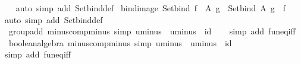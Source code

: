 \begin{isabellebody}
%
\isadelimproof
\ \ %
\endisadelimproof
%
\isatagproof
{}\isamarkupfalse%
\ {\isacharparenleft}{\kern0pt}auto\ simp\ add{\isacharcolon}{\kern0pt}\ Set{\isachardot}{\kern0pt}bind{\isacharunderscore}{\kern0pt}def{\isacharparenright}{\kern0pt}%
\endisatagproof
{\isafoldproof}%
%
\isadelimproof
\isanewline
%
\endisadelimproof
\isanewline
{}\isamarkupfalse%
\ bind{\isacharunderscore}{\kern0pt}image{\isacharcolon}{\kern0pt}\ {\isachardoublequoteopen}Set{\isachardot}{\kern0pt}bind\ {\isacharparenleft}{\kern0pt}f\ {\isacharbackquote}{\kern0pt}\ A{\isacharparenright}{\kern0pt}\ g\ {\isacharequal}{\kern0pt}\ Set{\isachardot}{\kern0pt}bind\ A\ {\isacharparenleft}{\kern0pt}g\ {\isasymcirc}\ f{\isacharparenright}{\kern0pt}{\isachardoublequoteclose}\isanewline
%
\isadelimproof
\ \ %
\endisadelimproof
%
\isatagproof
{}\isamarkupfalse%
\ {\isacharparenleft}{\kern0pt}auto\ simp\ add{\isacharcolon}{\kern0pt}\ Set{\isachardot}{\kern0pt}bind{\isacharunderscore}{\kern0pt}def{\isacharparenright}{\kern0pt}%
\endisatagproof
{\isafoldproof}%
%
\isadelimproof
\isanewline
%
\endisadelimproof
\isanewline
{}\isamarkupfalse%
\ {\isacharparenleft}{\kern0pt}\ group{\isacharunderscore}{\kern0pt}add{\isacharparenright}{\kern0pt}\ minus{\isacharunderscore}{\kern0pt}comp{\isacharunderscore}{\kern0pt}minus\ {\isacharbrackleft}{\kern0pt}simp{\isacharbrackright}{\kern0pt}{\isacharcolon}{\kern0pt}\ {\isachardoublequoteopen}uminus\ {\isasymcirc}\ uminus\ {\isacharequal}{\kern0pt}\ id{\isachardoublequoteclose}\isanewline
%
\isadelimproof
\ \ %
\endisadelimproof
%
\isatagproof
{}\isamarkupfalse%
\ {\isacharparenleft}{\kern0pt}simp\ add{\isacharcolon}{\kern0pt}\ fun{\isacharunderscore}{\kern0pt}eq{\isacharunderscore}{\kern0pt}iff{\isacharparenright}{\kern0pt}%
\endisatagproof
{\isafoldproof}%
%
\isadelimproof
\isanewline
%
\endisadelimproof
\isanewline
{}\isamarkupfalse%
\ {\isacharparenleft}{\kern0pt}\ boolean{\isacharunderscore}{\kern0pt}algebra{\isacharparenright}{\kern0pt}\ minus{\isacharunderscore}{\kern0pt}comp{\isacharunderscore}{\kern0pt}minus\ {\isacharbrackleft}{\kern0pt}simp{\isacharbrackright}{\kern0pt}{\isacharcolon}{\kern0pt}\ {\isachardoublequoteopen}uminus\ {\isasymcirc}\ uminus\ {\isacharequal}{\kern0pt}\ id{\isachardoublequoteclose}\isanewline
%
\isadelimproof
\ \ %
\endisadelimproof
%
\isatagproof
{}\isamarkupfalse%
\ {\isacharparenleft}{\kern0pt}simp\ add{\isacharcolon}{\kern0pt}\ fun{\isacharunderscore}{\kern0pt}eq{\isacharunderscore}{\kern0pt}iff{\isacharparenright}{\kern0pt}%

\end{isabellebody}
